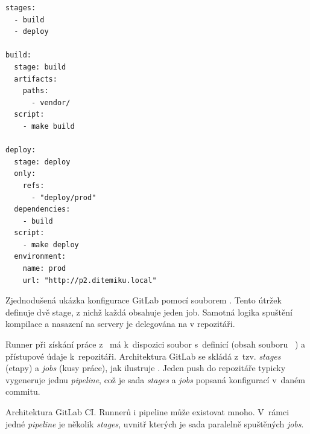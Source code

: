     \begin{iffigure}
        \centering
            \begin{verbatim}
stages:
  - build
  - deploy

build:
  stage: build
  artifacts:
    paths:
      - vendor/
  script:
    - make build

deploy:
  stage: deploy
  only:
    refs:
      - "deploy/prod"
  dependencies:
    - build
  script:
    - make deploy
  environment:
    name: prod
    url: "http://p2.ditemiku.local"
            \end{verbatim}
        \caption{Zjednodušená ukázka konfigurace GitLab \CI pomocí souborem . Tento útržek definuje dvě stage, z nichž každá obsahuje jeden job. Samotná logika spuštění kompilace a nasazení na servery je delegována na  v repozitáři.}
    \end{iffigure}

        Runner při získání práce z~ má k~dispozici soubor s~definicí (obsah souboru ~\cite{gitlab-runner-yaml}) a přístupové údaje k~repozitáři. Architektura GitLab \CI se skládá z~tzv. \textit{stages} (etapy) a \textit{jobs} (kusy práce), jak ilustruje . Jeden push do repozitáře typicky vygeneruje jednu \textit{pipeline}, což je sada \textit{stages} a \textit{jobs} popsaná konfigurací \CI v~daném commitu.

        \begin{iffigure}
            \vspace*{1cm}
            \centering
            \caption{Architektura GitLab CI. Runnerů i pipeline může existovat mnoho. V~rámci jedné \textit{pipeline} je několik \textit{stages}, uvnitř kterých je sada paralelně spuštěných \textit{jobs}.}
            \label{pic:gitlab-ci-architecture}
        \end{iffigure}


